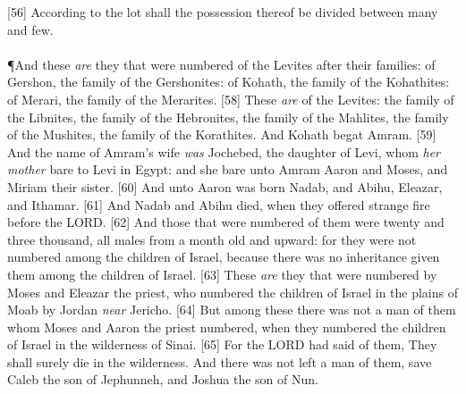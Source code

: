 [56] \textcolor[cmyk]{0.99998,1,0,0}{According to the lot shall the possession thereof be divided between many and few.}\\
\\
\P \textcolor[cmyk]{0.99998,1,0,0}{And these \emph{are} they that were numbered of the Levites after their families: of Gershon, the family of the Gershonites: of Kohath, the family of the Kohathites: of Merari, the family of the Merarites.}
[58] \textcolor[cmyk]{0.99998,1,0,0}{These \emph{are}  of the Levites: the family of the Libnites, the family of the Hebronites, the family of the Mahlites, the family of the Mushites, the family of the Korathites. And Kohath begat Amram.}
[59] \textcolor[cmyk]{0.99998,1,0,0}{And the name of Amram's wife \emph{was} Jochebed, the daughter of Levi, whom \emph{her} \emph{mother} bare to Levi in Egypt: and she bare unto Amram Aaron and Moses, and Miriam their sister.}
[60] \textcolor[cmyk]{0.99998,1,0,0}{And unto Aaron was born Nadab, and Abihu, Eleazar, and Ithamar.}
[61] \textcolor[cmyk]{0.99998,1,0,0}{And Nadab and Abihu died, when they offered strange fire before the LORD.}
[62] \textcolor[cmyk]{0.99998,1,0,0}{And those that were numbered of them were twenty and three thousand, all males from a month old and upward: for they were not numbered among the children of Israel, because there was no inheritance given them among the children of Israel.}
[63] \textcolor[cmyk]{0.99998,1,0,0}{These \emph{are} they that were numbered by Moses and Eleazar the priest, who numbered the children of Israel in the plains of Moab by Jordan \emph{near} Jericho.}
[64] \textcolor[cmyk]{0.99998,1,0,0}{But among these there was not a man of them whom Moses and Aaron the priest numbered, when they numbered the children of Israel in the wilderness of Sinai.}
[65] \textcolor[cmyk]{0.99998,1,0,0}{For the LORD had said of them, They shall surely die in the wilderness. And there was not left a man of them, save Caleb the son of Jephunneh, and Joshua the son of Nun.}